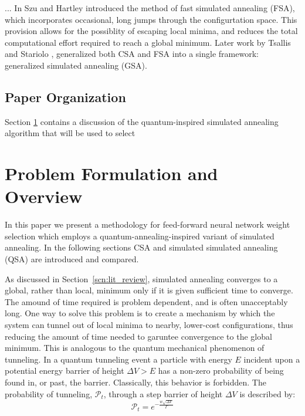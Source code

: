 \documentclass[10pt,journal,cspaper,compsoc]{IEEEtran}
\begin{document}
... In \cite{} Szu and Hartley introduced the method of fast simulated annealing (FSA), which incorporates occasional, long jumps through the configurtation space. This provision allows for the possiblity of escaping local minima, and reduces the total computational effort required to reach a global minimum. Later work by Tsallis and Stariolo \cite{}, generalized both CSA and FSA into a single framework: generalized simulated annealing (GSA).

\subsection{Paper Organization}
\label{scn:paper_organization}
Section \ref{scn:problem_formulation} contains a discussion of the quantum-inspired simulated annealing algorithm that will be used to select 

\section{Problem Formulation and Overview}
\label{scn:problem_formulation}

In this paper we present a methodology for feed-forward neural network weight selection which employs a quantum-annealing-inspired variant of simulated annealing. In the following sections CSA and simulated simulated annealing (QSA) are introduced and compared. 

As discussed in Section~\ref{scn:lit_review}, simulated annealing converges to a global, rather than local, minimum only if it is given sufficient time to converge. The amound of time required is problem dependent, and is often unacceptably long. One way to solve this problem is to create a mechanism by which the system can tunnel out of local minima to nearby, lower-cost configurations, thus reducing the amount of time needed to garuntee convergence to the global minimum. This is analogous to the quantum mechanical phenomenon of tunneling. In a quantum tunneling event a particle with energy \begin{math} E \end{math} incident upon a potential energy barrier of height \begin{math} \Delta V > E  \end{math} has a non-zero probability of being found in, or past, the barrier. Classically, this behavior is forbidden. The probability of tunneling, \begin{math} \mathcal{P}_t \end{math}, through a step barrier of height \begin{math} \Delta V  \end{math} is described by: 
\begin{equation} \label{eq:quantum_transition_prob}
\mathcal{P}_t = e^{-\frac{w \sqrt{\Delta V}}{ \Gamma}} 
\end{equation}
\end{document}
